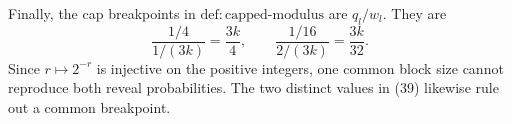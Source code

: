 Finally, the cap breakpoints in
\(\mathrm{def{:}capped\text{-}modulus}\) are \(q_l/w_l\).  They are
\[
 \frac{1/4}{1/(3k)}=\frac{3k}{4},
 \qquad
 \frac{1/16}{2/(3k)}=\frac{3k}{32}.
\tag{39}
\]
Since \(r\mapsto2^{-r}\) is injective on the positive integers, one
common block size cannot reproduce both reveal probabilities.  The
two distinct values in (39) likewise rule out a common breakpoint.
